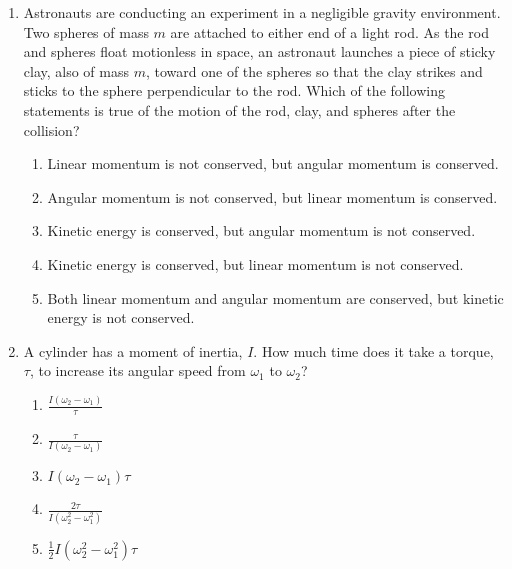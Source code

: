 \documentclass{../../../oss-apphys}
\begin{document}
\begin{multicols}{2}
\begin{enumerate}[leftmargin=18pt]
  \item Astronauts are conducting an experiment in a negligible gravity
    environment. Two spheres of mass $m$ are attached to either end of a light
    rod. As the rod and spheres float motionless in space, an astronaut
    launches a piece of sticky clay, also of mass $m$, toward one of the spheres
    so that the clay strikes and sticks to the sphere perpendicular to the rod.
    Which of the following statements is true of the motion of the rod, clay,
    and spheres after the collision?
    \begin{center}
    \end{center}
    \begin{enumerate}[nosep,leftmargin=18pt,label=(\Alph*)]
    \item Linear momentum is not conserved, but angular momentum is conserved.
    \item Angular momentum is not conserved, but linear momentum is conserved.
    \item Kinetic energy is conserved, but angular momentum is not conserved.
    \item Kinetic energy is conserved, but linear momentum is not conserved.
    \item Both linear momentum and angular momentum are conserved, but kinetic
      energy is not conserved.
    \end{enumerate}
    
  \item A cylinder has a moment of inertia, $I$. How much time does it take a
    torque, $\tau$, to increase its angular speed from $\omega_1$ to
    $\omega_2$?
    \begin{enumerate}[nosep,leftmargin=18pt,label=(\Alph*)]
    \item $\displaystyle\frac{I(\omega_2-\omega_1)}{\tau}$
    \item $\displaystyle\frac{\tau}{I(\omega_2-\omega_1)}$
    \item $\displaystyle I(\omega_2-\omega_1)\tau$
    \item $\displaystyle\frac{2\tau}{I(\omega_2^2-\omega_1^2)}$
    \item $\displaystyle\frac12I(\omega_2^2-\omega_1^2)\tau$
    \end{enumerate}
    \columnbreak
    

\end{enumerate}
\end{multicols}
\end{document}
